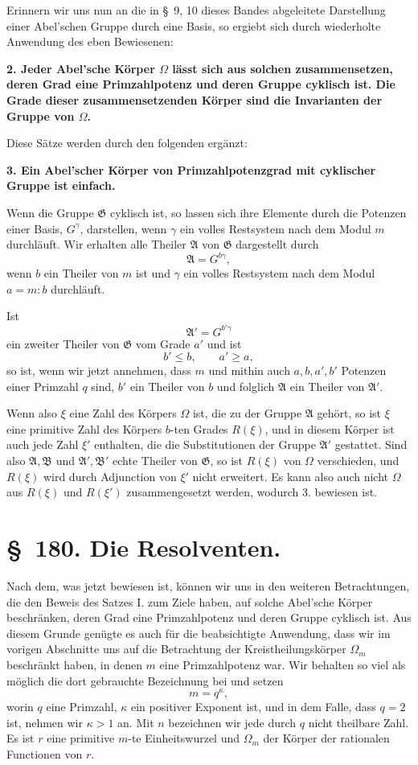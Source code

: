 \documentclass[11pt]{article}
\newcommand{\Om}{\Omega}
\newcommand{\Gg}{\mathfrak G}
\newcommand{\Aa}{\mathfrak A}
\newcommand{\Bb}{\mathfrak B}
\begin{document}
Erinnern wir uns nun an die in \S~9, 10 dieses Bandes abgeleitete Darstellung einer Abel'schen Gruppe durch eine Basis, so ergiebt sich durch wiederholte Anwendung des eben Bewiesenen:

\textbf{2. Jeder Abel'sche Körper $\Om$ lässt sich aus solchen zusammensetzen, deren Grad eine Primzahlpotenz und deren Gruppe cyklisch ist. Die Grade dieser zusammensetzenden Körper sind die Invarianten der Gruppe von $\Om$.}

Diese Sätze werden durch den folgenden ergänzt:

\textbf{3. Ein Abel'scher Körper von Primzahlpotenzgrad mit cyklischer Gruppe ist einfach.}

Wenn die Gruppe $\Gg$ cyklisch ist, so lassen sich ihre Elemente durch die Potenzen einer Basis, $G^\gamma$, darstellen, wenn $\gamma$ ein volles Restsystem nach dem Modul $m$ durchläuft. Wir erhalten alle Theiler $\Aa$ von $\Gg$ dargestellt durch
\[
  \Aa=G^{b\gamma},
\]
wenn $b$ ein Theiler von $m$ ist und $\gamma$ ein volles Restsystem nach dem Modul $a=m:b$ durchläuft.

Ist
\[
  \Aa'=G^{b'\gamma}
\]
ein zweiter Theiler von $\Gg$ vom Grade $a'$ und ist
\[
  b'\le b,
  \qquad a'\ge a,
\]
so ist, wenn wir jetzt annehmen, dass $m$ und mithin auch $a,b,a',b'$ Potenzen einer Primzahl $q$ sind, $b'$ ein Theiler von $b$ und folglich $\Aa$ ein Theiler von $\Aa'$.

Wenn also $\xi$ eine Zahl des Körpers $\Om$ ist, die zu der Gruppe $\Aa$ gehört, so ist $\xi$ eine primitive Zahl des Körpers $b$-ten Grades $R(\xi)$, und in diesem Körper ist auch jede Zahl $\xi'$ enthalten, die die Substitutionen der Gruppe $\Aa'$ gestattet. Sind also $\Aa,\Bb$ und $\Aa',\Bb'$ echte Theiler von $\Gg$, so ist $R(\xi)$ von $\Om$ verschieden, und $R(\xi)$ wird durch Adjunction von $\xi'$ nicht erweitert. Es kann also auch nicht $\Om$ aus $R(\xi)$ und $R(\xi')$ zusammengesetzt werden, wodurch 3. bewiesen ist.

\section*{\S~180. Die Resolventen.}

Nach dem, was jetzt bewiesen ist, können wir uns in den weiteren Betrachtungen, die den Beweis des Satzes I. zum Ziele haben, auf solche Abel'sche Körper beschränken, deren Grad eine Primzahlpotenz und deren Gruppe cyklisch ist. Aus diesem Grunde genügte es auch für die beabsichtigte Anwendung, dass wir im vorigen Abschnitte uns auf die Betrachtung der Kreistheilungskörper $\Omega_m$ beschränkt haben, in denen $m$ eine Primzahlpotenz war. Wir behalten so viel als möglich die dort gebrauchte Bezeichnung bei und setzen
\begin{equation}
  m=q^\kappa,
\tag{1}
\end{equation}
worin $q$ eine Primzahl, $\kappa$ ein positiver Exponent ist, und in dem Falle, dass $q=2$ ist, nehmen wir $\kappa>1$ an. Mit $n$ bezeichnen wir jede durch $q$ nicht theilbare Zahl. Es ist $r$ eine primitive $m$-te Einheitswurzel und $\Omega_m$ der Körper der rationalen Functionen von $r$.
\end{document}
